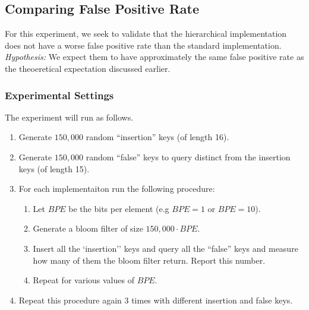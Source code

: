 \subsection{Comparing False Positive Rate}

For this experiment, we seek to validate that the hierarchical implementation does not have a worse false positive rate than the standard implementation.
\textit{Hypothesis:} We expect them to have approximately the same false positive rate as the theoeretical expectation discussed earlier.

\subsubsection{Experimental Settings}

The experiment will run as follows. 
\begin{enumerate}
\item Generate $150,000$ random ``insertion'' keys (of length 16).
\item Generate $150,000$ random ``false'' keys to query distinct from the insertion keys (of length 15).
\item For each implementaiton run the following procedure:
\begin{enumerate}
    \item Let $BPE$ be the bits per element (e.g $BPE = 1$ or $BPE = 10$).
    \item Generate a bloom filter of size $150,000\cdot BPE$.
    \item Insert all the `insertion'' keys and query all the ``false'' keys and measure how many of them the bloom filter return. Report this number.
    \item Repeat for various values of $BPE$.
\end{enumerate}
\item Repeat this procedure again $3$ times with different insertion and false keys.
\end{enumerate}


